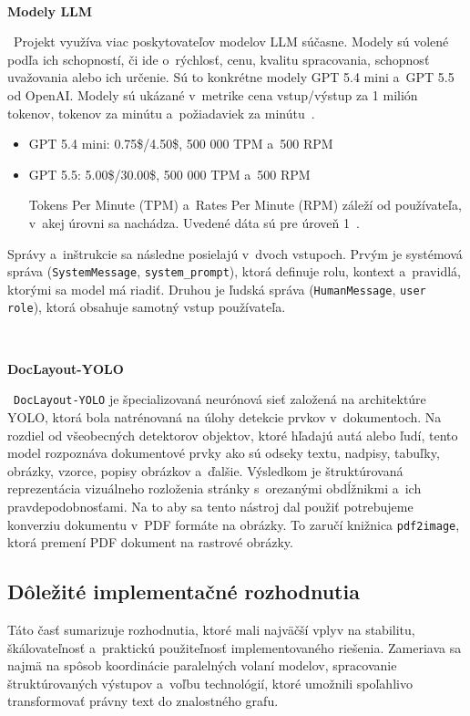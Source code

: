 \

\noindent\textbf{Modely LLM}

\
Projekt využíva viac poskytovateľov modelov LLM súčasne. Modely sú volené podľa ich schopností, či ide o~rýchlosť, cenu, kvalitu spracovania, schopnosť uvažovania alebo ich určenie. Sú to konkrétne modely GPT 5.4 mini a~GPT 5.5 od OpenAI. Modely sú ukázané v~metrike cena vstup/výstup za 1 milión tokenov, tokenov za minútu a~požiadaviek za minútu~\cite{openaiPricing,openaiOrganizationLimits}.

\begin{itemize}
    \item GPT 5.4 mini: 0.75\$/4.50\$, 500 000 TPM a~500 RPM
    \item GPT 5.5: 5.00\$/30.00\$, 500 000 TPM a~500 RPM
    
    Tokens Per Minute (TPM) a~Rates Per Minute (RPM) záleží od používateľa, v~akej úrovni sa nachádza. Uvedené dáta sú pre úroveň 1~\cite{openaiOrganizationLimits}.
\end{itemize}

Správy a~inštrukcie sa následne posielajú v~dvoch vstupoch. Prvým je systémová správa (\texttt{SystemMessage}, \texttt{system\_prompt}), ktorá definuje rolu, kontext a~pravidlá, ktorými sa model má riadiť. Druhou je ľudská správa (\texttt{HumanMessage}, \texttt{user role}), ktorá obsahuje samotný vstup používateľa.

\

\noindent\textbf{DocLayout-YOLO}

\
\texttt{DocLayout-YOLO} je špecializovaná neurónová sieť založená na architektúre YOLO, ktorá bola natrénovaná na úlohy detekcie prvkov v~dokumentoch. Na rozdiel od všeobecných detektorov objektov, ktoré hľadajú autá alebo ľudí, tento model rozpoznáva dokumentové prvky ako sú odseky textu, nadpisy, tabuľky, obrázky, vzorce, popisy obrázkov a~ďalšie. Výsledkom je štruktúrovaná reprezentácia vizuálneho rozloženia stránky s~orezanými obdĺžnikmi a~ich pravdepodobnosťami. Na to aby sa tento nástroj dal použiť potrebujeme konverziu dokumentu v~PDF formáte na obrázky. To zaručí knižnica \texttt{pdf2image}, ktorá premení PDF dokument na rastrové obrázky.



\subsection{Dôležité implementačné rozhodnutia}

Táto časť sumarizuje rozhodnutia, ktoré mali najväčší vplyv na stabilitu, škálovateľnosť a~praktickú použiteľnosť implementovaného riešenia. Zameriava sa najmä na spôsob koordinácie paralelných volaní modelov, spracovanie štruktúrovaných výstupov a~voľbu technológií, ktoré umožnili spoľahlivo transformovať právny text do znalostného grafu.

